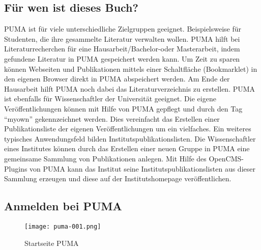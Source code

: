\documentclass[b5paper,11pt,twoside]{scrbook} %
\begin{document}
\subsection{Für wen ist dieses Buch?}
PUMA ist für viele unterschiedliche Zielgruppen geeignet. Beispielsweise für Studenten, die ihre gesammelte Literatur verwalten wollen. PUMA hilft bei Literaturrecherchen für eine Hausarbeit/Bachelor-oder Masterarbeit, indem gefundene Literatur in PUMA gespeichert werden kann. Um Zeit zu sparen können Webseiten und Publikationen mittels einer Schaltfläche (Bookmarklet) in den eigenen Browser direkt in PUMA abspeichert werden. Am Ende der Hausarbeit hilft PUMA noch dabei das Literaturverzeichnis zu erstellen.
\newline 
PUMA ist ebenfalls für Wissenschaftler der Universität geeignet. Die eigene Veröffentlichungen können mit Hilfe von PUMA gepflegt und  durch den Tag \enquote{myown} gekennzeichnet werden. Dies vereinfacht das Erstellen einer Publikationsliste der eigenen Veröffentlichungen um ein vielfaches.
\newline Ein weiteres typisches Anwendungsfeld bilden Institutspublikationslisten. Die Wissenschaftler eines Institutes können durch das Erstellen einer neuen Gruppe in PUMA eine gemeinsame Sammlung von Publikationen anlegen. Mit Hilfe des OpenCMS-Plugins von PUMA kann das Institut seine Institutspublikationslisten aus dieser Sammlung erzeugen und diese auf der Institutshomepage veröffentlichen.

   
\subsection{Anmelden bei PUMA} 
\begin{figure}[ht]
 \centering
 \texttt{[image: puma-001.png]}
 \caption{Startseite PUMA}
 \label{figure1}
\end{figure}
\end{document}
